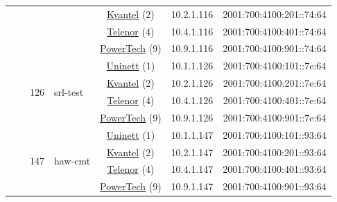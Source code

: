 \begin{small}
\begin{center}
\begin{longtable}{|c|c|c|c|c|c|c|c|}
  &  &  &  & \multicolumn{2}{|c|}{\tiny{\href{http://kvantel.no}{Kvantel} (2)}} & \tiny{10.2.1.116} & \tiny{2001:700:4100:201::74:64} \\* \cline{5-5}\cline{6-6}\cline{7-7}\cline{8-8}
  &  &  &  & \multicolumn{2}{|c|}{\tiny{\href{https://www.telenor.no}{Telenor} (4)}} & \tiny{10.4.1.116} & \tiny{2001:700:4100:401::74:64} \\* \cline{5-5}\cline{6-6}\cline{7-7}\cline{8-8}
  &  &  &  & \multicolumn{2}{|c|}{\tiny{\href{http://www.powertech.no}{PowerTech} (9)}} & \tiny{10.9.1.116} & \tiny{2001:700:4100:901::74:64} \\* \cline{3-3}\cline{4-4}\cline{5-5}\cline{6-6}\cline{7-7}\cline{8-8}
  &  & \multirow{4}{*}{\tiny{126}} & \multicolumn{1}{|l|}{\multirow{4}{*}{\tiny{srl-test}}} & \multicolumn{2}{|c|}{\tiny{\href{https://www.uninett.no}{Uninett} (1)}} & \tiny{10.1.1.126} & \tiny{2001:700:4100:101::7e:64} \\* \cline{5-5}\cline{6-6}\cline{7-7}\cline{8-8}
  &  &  &  & \multicolumn{2}{|c|}{\tiny{\href{http://kvantel.no}{Kvantel} (2)}} & \tiny{10.2.1.126} & \tiny{2001:700:4100:201::7e:64} \\* \cline{5-5}\cline{6-6}\cline{7-7}\cline{8-8}
  &  &  &  & \multicolumn{2}{|c|}{\tiny{\href{https://www.telenor.no}{Telenor} (4)}} & \tiny{10.4.1.126} & \tiny{2001:700:4100:401::7e:64} \\* \cline{5-5}\cline{6-6}\cline{7-7}\cline{8-8}
  &  &  &  & \multicolumn{2}{|c|}{\tiny{\href{http://www.powertech.no}{PowerTech} (9)}} & \tiny{10.9.1.126} & \tiny{2001:700:4100:901::7e:64} \\* \cline{3-3}\cline{4-4}\cline{5-5}\cline{6-6}\cline{7-7}\cline{8-8}
  &  & \multirow{4}{*}{\tiny{147}} & \multicolumn{1}{|l|}{\multirow{4}{*}{\tiny{haw-cmt}}} & \multicolumn{2}{|c|}{\tiny{\href{https://www.uninett.no}{Uninett} (1)}} & \tiny{10.1.1.147} & \tiny{2001:700:4100:101::93:64} \\* \cline{5-5}\cline{6-6}\cline{7-7}\cline{8-8}
  &  &  &  & \multicolumn{2}{|c|}{\tiny{\href{http://kvantel.no}{Kvantel} (2)}} & \tiny{10.2.1.147} & \tiny{2001:700:4100:201::93:64} \\* \cline{5-5}\cline{6-6}\cline{7-7}\cline{8-8}
  &  &  &  & \multicolumn{2}{|c|}{\tiny{\href{https://www.telenor.no}{Telenor} (4)}} & \tiny{10.4.1.147} & \tiny{2001:700:4100:401::93:64} \\* \cline{5-5}\cline{6-6}\cline{7-7}\cline{8-8}
  &  &  &  & \multicolumn{2}{|c|}{\tiny{\href{http://www.powertech.no}{PowerTech} (9)}} & \tiny{10.9.1.147} & \tiny{2001:700:4100:901::93:64} \\* \cline{3-3}\cline{4-4}\cline{5-5}\cline{6-6}\cline{7-7}\cline{8-8}

\end{longtable}
\end{center}
\end{small}
